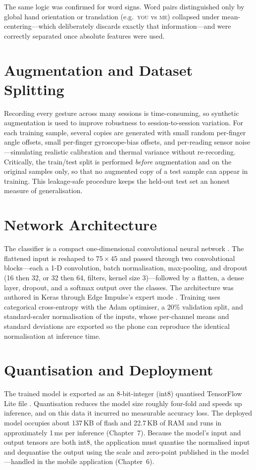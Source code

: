 The same logic was confirmed for word signs. Word pairs distinguished only by
global hand orientation or translation (e.g.\ \textsc{you} vs \textsc{me})
collapsed under mean-centering—which deliberately discards exactly that
information—and were correctly separated once absolute features were used.

\section{Augmentation and Dataset Splitting}

Recording every gesture across many sessions is time-consuming, so synthetic
augmentation is used to improve robustness to session-to-session variation.
For each training sample, several copies are generated with small random
per-finger angle offsets, small per-finger gyroscope-bias offsets, and
per-reading sensor noise—simulating realistic calibration and thermal variance
without re-recording. Critically, the train/test split is performed
\emph{before} augmentation and on the original samples only, so that no
augmented copy of a test sample can appear in training. This leakage-safe
procedure keeps the held-out test set an honest measure of generalisation.

\section{Network Architecture}

The classifier is a compact one-dimensional convolutional neural network
\cite{ronao2016}. The flattened input is reshaped to $75 \times 45$ and passed
through two convolutional blocks—each a 1-D convolution, batch normalisation,
max-pooling, and dropout (16 then 32, or 32 then 64, filters, kernel size
3)—followed by a flatten, a dense layer, dropout, and a softmax output over the
classes. The architecture was authored in Keras through Edge Impulse's expert
mode \cite{edgeimpulse}. Training uses categorical cross-entropy with the Adam
optimiser, a 20\% validation split, and standard-scaler normalisation of the
inputs, whose per-channel means and standard deviations are exported so the
phone can reproduce the identical normalisation at inference time.

\section{Quantisation and Deployment}

The trained model is exported as an 8-bit-integer (int8) quantised TensorFlow
Lite file \cite{tflite}. Quantisation reduces the model size roughly four-fold
and speeds up inference, and on this data it incurred no measurable accuracy
loss. The deployed model occupies about 137\,KB of flash and 22.7\,KB of RAM
and runs in approximately 1\,ms per inference (Chapter~7). Because the model's
input and output tensors are both int8, the application must quantise the
normalised input and dequantise the output using the scale and zero-point
published in the model—handled in the mobile application (Chapter~6).
